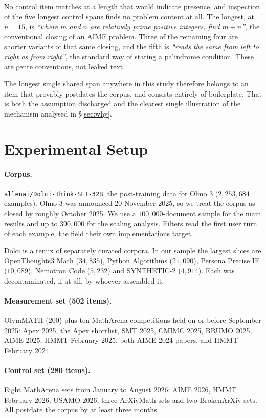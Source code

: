 \documentclass[11pt]{article}
\begin{document}
No control item matches at a length that would indicate presence, and inspection
of the five longest control spans finds no problem content at all. The longest,
at $n{=}15$, is \emph{``where $m$ and $n$ are relatively prime positive integers,
find $m+n$''}, the conventional closing of an AIME problem. Three of the
remaining four are shorter variants of that same closing, and the fifth is
\emph{``reads the same from left to right as from right''}, the standard way of
stating a palindrome condition. These are genre conventions, not leaked text.

The longest single shared span anywhere in this study therefore belongs to an item
that provably postdates the corpus, and consists entirely of boilerplate. That is
both the assumption discharged and the clearest single illustration of the
mechanism analysed in \S\ref{sec:why}.

\section{Experimental Setup}

\paragraph{Corpus.}
\texttt{allenai/Dolci-Think-SFT-32B}, the post-training data for Olmo 3
($2{,}253{,}684$ examples). Olmo 3 was announced 20 November 2025, so we treat the
corpus as closed by roughly October 2025. We use a $100{,}000$-document sample for
the main results and up to $390{,}000$ for the scaling analysis. Filters read the
first user turn of each example, the field their own implementations target.

Dolci is a remix of separately curated corpora. In our sample the largest slices
are OpenThoughts3 Math ($34{,}835$), Python Algorithms ($21{,}090$), Persona
Precise IF ($10{,}089$), Nemotron Code ($5{,}232$) and SYNTHETIC-2 ($4{,}914$).
Each was decontaminated, if at all, by whoever assembled it.

\paragraph{Measurement set (502 items).}
OlymMATH (200) plus ten MathArena competitions held on or before September 2025:
Apex 2025, the Apex shortlist, SMT 2025, CMIMC 2025, BRUMO 2025, AIME 2025,
HMMT February 2025, both AIME 2024 papers, and HMMT February 2024.

\paragraph{Control set (280 items).}
Eight MathArena sets from January to August 2026: AIME 2026, HMMT February 2026,
USAMO 2026, three ArXivMath sets and two BrokenArXiv sets. All postdate the
corpus by at least three months.
\end{document}
